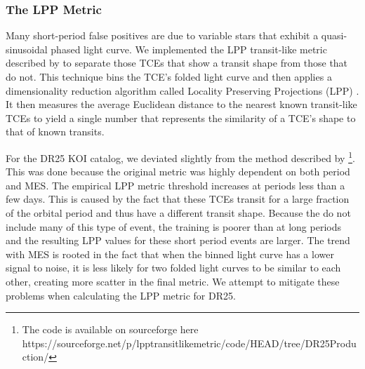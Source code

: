 

\subsubsection{The LPP Metric}
\label{s:lpp}

Many short-period false positives are due to variable stars that exhibit a quasi-sinusoidal phased light curve. We implemented the LPP transit-like metric described by \citet{Thompson2015b} to separate those TCEs that show a transit shape from those that do not. This technique bins the TCE's folded light curve and then applies a dimensionality reduction algorithm called Locality Preserving Projections (LPP) \citep{He2004}.  It then measures the average Euclidean distance to the nearest known transit-like TCEs to yield a single number that represents the similarity of a TCE's shape to that of known transits. 

For the DR25 KOI catalog, we deviated slightly from the method described by \citet{Thompson2015b} \footnote{The code is available on sourceforge here https://sourceforge.net/p/lpptransitlikemetric/code/HEAD/tree/DR25Production/}.  This was done because the original metric was highly dependent on both period and MES. The empirical LPP metric threshold increases at periods less than a few days. This is caused by the fact that these TCEs transit for a large fraction of the orbital period and thus have a different transit shape. Because the  do not include many of this type of event, the training is poorer than at long periods and the resulting LPP values for these short period events are larger. The trend with MES is rooted in the fact that when the binned light curve has a lower signal to noise, it is less likely for two folded light curves to be similar to each other, creating more scatter in the final metric. We attempt to mitigate these problems when calculating the LPP metric for DR25.

